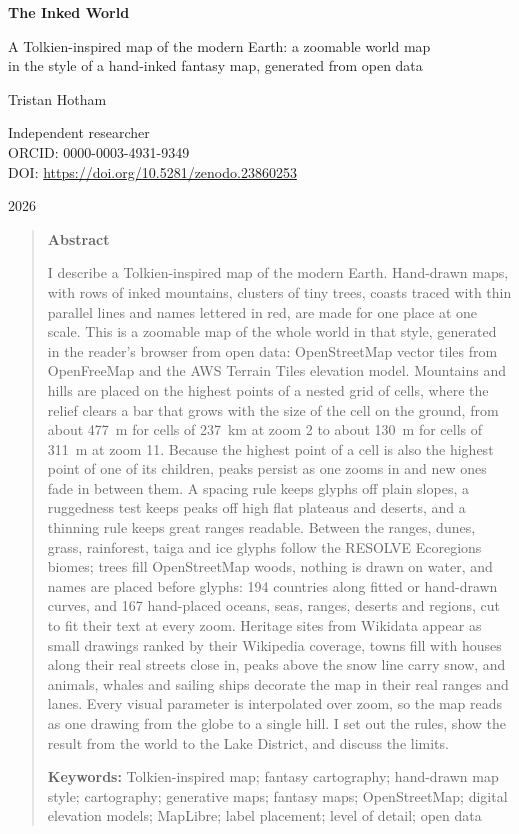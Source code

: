 \documentclass[11pt,a4paper]{article}
\begin{document}
\begin{center}
{\Large\bfseries The Inked World\par}
\vspace{0.4em}
{\large A Tolkien-inspired map of the modern Earth: a zoomable world map\\in the style of a hand-inked fantasy map, generated from open data\par}
\vspace{1.2em}
{\large Tristan Hotham\par}
\vspace{0.3em}
{\small Independent researcher\\
ORCID: 0000-0003-4931-9349\\
DOI: \url{https://doi.org/10.5281/zenodo.23860253}\par}
\vspace{0.8em}
2026
\end{center}

\begin{quote}
\small
\begin{center}\textbf{Abstract}\end{center}
I describe a Tolkien-inspired map of the modern Earth. Hand-drawn maps, with rows of inked mountains, clusters of tiny trees, coasts traced with thin parallel lines and names lettered in red, are made for one place at one scale. This is a zoomable map of the whole world in that style, generated in the reader's browser from open data: OpenStreetMap vector tiles from OpenFreeMap and the AWS Terrain Tiles elevation model. Mountains and hills are placed on the highest points of a nested grid of cells, where the relief clears a bar that grows with the size of the cell on the ground, from about 477~m for cells of 237~km at zoom 2 to about 130~m for cells of 311~m at zoom 11. Because the highest point of a cell is also the highest point of one of its children, peaks persist as one zooms in and new ones fade in between them. A spacing rule keeps glyphs off plain slopes, a ruggedness test keeps peaks off high flat plateaus and deserts, and a thinning rule keeps great ranges readable. Between the ranges, dunes, grass, rainforest, taiga and ice glyphs follow the RESOLVE Ecoregions biomes; trees fill OpenStreetMap woods, nothing is drawn on water, and names are placed before glyphs: 194 countries along fitted or hand-drawn curves, and 167 hand-placed oceans, seas, ranges, deserts and regions, cut to fit their text at every zoom. Heritage sites from Wikidata appear as small drawings ranked by their Wikipedia coverage, towns fill with houses along their real streets close in, peaks above the snow line carry snow, and animals, whales and sailing ships decorate the map in their real ranges and lanes. Every visual parameter is interpolated over zoom, so the map reads as one drawing from the globe to a single hill. I set out the rules, show the result from the world to the Lake District, and discuss the limits.

\textbf{Keywords:} Tolkien-inspired map; fantasy cartography; hand-drawn map style; cartography; generative maps; fantasy maps; OpenStreetMap; digital elevation models; MapLibre; label placement; level of detail; open data
\end{quote}
\end{document}
